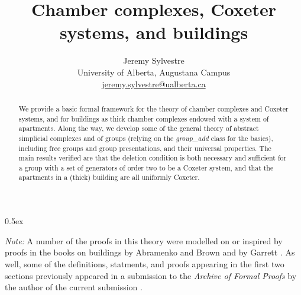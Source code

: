 \documentclass[11pt,a4paper]{article}
\begin{document}
\title{Chamber complexes, Coxeter systems, and buildings}
\author{Jeremy Sylvestre \\ University of Alberta, Augustana Campus \\ \href{mailto:jeremy.sylvestre@ualberta.ca}{\url{jeremy.sylvestre@ualberta.ca}}}
\maketitle

\begin{abstract}
We provide a basic formal framework for the theory of chamber complexes and Coxeter systems, and for buildings as thick chamber complexes endowed with a system of apartments. Along the way, we develop some of the general theory of abstract simplicial complexes and of groups (relying on the \textit{group{\_}add} class for the basics), including free groups and group presentations, and their universal properties. The main results verified are that the deletion condition is both necessary and sufficient for a group with a set of generators of order two to be a Coxeter system, and that the apartments in a (thick) building are all uniformly Coxeter.
\end{abstract}

\tableofcontents

\parindent 0pt\parskip 0.5ex

\vspace*{32pt}
\textit{Note:} A number of the proofs in this theory were modelled on or inspired by proofs in the books on buildings by Abramenko and Brown \cite{Abramenko+Brown:Buildings} and by Garrett \cite{Garrett:Buildings}. As well, some of the definitions, statments, and proofs appearing in the first two sections previously appeared in a submission to the \textit{Archive of Formal Proofs} by the author of the current submission \cite{Sylvestre-AFP15}.
\vspace*{32pt}



\clearpage

\nocite{Johnson:GroupPres}


\end{document}
